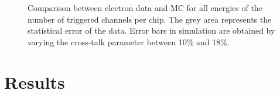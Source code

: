 \documentclass[twoside,a4paper,11pt]{article}
\begin{document}
\begin{figure}[htbp]
	\hfill
	\hfill
	\caption[]{Comparison between electron data and MC for all energies of the number of triggered channels per chip. The grey area represents the statistical error of the data. Error bars in simulation are obtained by varying the cross-talk parameter between 10\% and 18\%.}
	\label{fig:sim_data_elec_nHits}
\end{figure}

\newpage
\section{Results}
\end{document}
